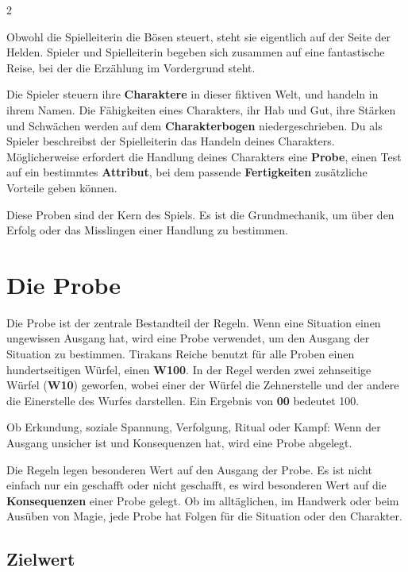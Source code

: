 \label{ch:game-concept}

\begin{multicols*}{2}

Obwohl die Spielleiterin die Bösen steuert, steht sie eigentlich auf der Seite der Helden.
Spieler und Spielleiterin begeben sich zusammen auf eine fantastische Reise, bei der die Erzählung im Vordergrund steht.

Die Spieler steuern ihre \textbf{Charaktere} in dieser fiktiven Welt, und handeln in ihrem Namen.
Die Fähigkeiten eines Charakters, ihr Hab und Gut, ihre Stärken und Schwächen werden auf dem \textbf{Charakterbogen} niedergeschrieben.
Du als Spieler beschreibst der Spielleiterin das Handeln deines Charakters.
Möglicherweise erfordert die Handlung deines Charakters eine \textbf{Probe}, einen Test auf ein bestimmtes \textbf{Attribut}, bei dem passende \textbf{Fertigkeiten} zusätzliche Vorteile geben können.

Diese Proben sind der Kern des Spiels.
Es ist die Grundmechanik, um über den Erfolg oder das Misslingen einer Handlung zu bestimmen.

\section{Die Probe}\label{sec:die-probe}

Die Probe ist der zentrale Bestandteil der Regeln.
Wenn eine Situation einen ungewissen Ausgang hat, wird eine Probe verwendet, um den Ausgang der Situation zu bestimmen.
Tirakans Reiche benutzt für alle Proben einen hundertseitigen Würfel, einen \textbf{W100}.
In der Regel werden zwei zehnseitige Würfel (\textbf{W10}) geworfen, wobei einer der Würfel die Zehnerstelle und der andere die Einerstelle des Wurfes darstellen.
Ein Ergebnis von \textbf{00} bedeutet 100.

Ob Erkundung, soziale Spannung, Verfolgung, Ritual oder Kampf: Wenn der Ausgang unsicher ist und Konsequenzen hat, wird eine Probe abgelegt.

Die Regeln legen besonderen Wert auf den Ausgang der Probe. Es ist nicht einfach nur ein geschafft oder nicht geschafft, es wird besonderen Wert auf die \textbf{Konsequenzen} einer Probe gelegt. Ob im alltäglichen, im Handwerk oder beim Ausüben von Magie, jede Probe hat Folgen für die Situation oder den Charakter.

\subsection{Zielwert}\label{subsec:zielwert}


\end{multicols*}
